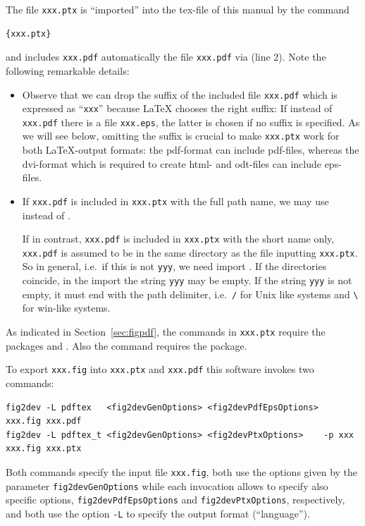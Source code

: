 \documentclass[12pt]{book}
\begin{document}
The file \texttt{xxx.ptx} is ``imported'' into the tex-file of this manual 
by the command 
%
\begin{verbatim}
{xxx.ptx}
\end{verbatim}
and includes \texttt{xxx.pdf} automatically the file \texttt{xxx.pdf} 
via  (line 2). 
Note the following remarkable details: 
%
\begin{itemize}
\item
Observe that we can drop the suffix of the included file \texttt{xxx.pdf} 
which is expressed as ``\texttt{xxx}'' 
because \LaTeX{} chooses the right suffix: 
If instead of \texttt{xxx.pdf} there is a file \texttt{xxx.eps}, 
the latter is chosen if no suffix is specified. 
As we will see below, 
omitting the suffix is crucial to make \texttt{xxx.ptx} work 
for both \LaTeX-output formats: 
the pdf-format can include pdf-files, 
whereas the dvi-format which is required to create html- and
odt-files can include eps-files. 
\item
If \texttt{xxx.pdf} is included in \texttt{xxx.ptx} 
with the full path name, 
we may use  instead of . 

If in contrast, \texttt{xxx.pdf} is included in \texttt{xxx.ptx} 
with the short name only, 
\texttt{xxx.pdf} is assumed to be in the same directory 
as the file inputting \texttt{xxx.ptx}. 
So in general, i.e.~if this is not \texttt{yyy}, we need import 
. 
If the directories coincide, 
in the import the string \texttt{yyy} may be empty. 
If the string \texttt{yyy} is not empty, it must end with the path delimiter, 
i.e.~\texttt/ for Unix like systems and 
\texttt{\textbackslash} for win-like systems. 
\end{itemize}

As indicated in Section~\ref{sec:figpdf}, 
the commands in \texttt{xxx.ptx} 
require the packages  and . 
Also the  command 
requires the  package. 

To export \texttt{xxx.fig} into \texttt{xxx.ptx} and \texttt{xxx.pdf} 
this software invokes two commands: 
%
\begin{Verbatim}[fontsize=\scriptsize]
fig2dev -L pdftex   <fig2devGenOptions> <fig2devPdfEpsOptions>        xxx.fig xxx.pdf   
fig2dev -L pdftex_t <fig2devGenOptions> <fig2devPtxOptions>    -p xxx xxx.fig xxx.ptx
\end{Verbatim}
%
Both commands specify the input file \texttt{xxx.fig}, 
both use the options given by the parameter \texttt{fig2devGenOptions} 
while each invocation allows to specify also specific options, 
\texttt{fig2devPdfEpsOptions} and \texttt{fig2devPtxOptions}, respectively, 
and both use the option \texttt{-L} 
to specify the output format (``language''). 
\end{document}
